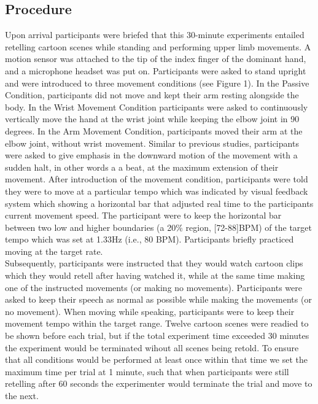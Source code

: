 \documentclass[
  man,floatsintext]{apa6}
\begin{document}
\hypertarget{procedure}{%
\subsection{Procedure}\label{procedure}}

Upon arrival participants were briefed that this 30-minute experiments entailed retelling cartoon scenes while standing and performing upper limb movements. A motion sensor was attached to the tip of the index finger of the dominant hand, and a microphone headset was put on. Participants were asked to stand upright and were introduced to three movement conditions (see Figure 1). In the Passive Condition, participants did not move and kept their arm resting alongside the body. In the Wrist Movement Condition participants were asked to continuously vertically move the hand at the wrist joint while keeping the elbow joint in 90 degrees. In the Arm Movement Condition, participants moved their arm at the elbow joint, without wrist movement. Similar to previous studies, participants were asked to give emphasis in the downward motion of the movement with a sudden halt, in other words a a beat, at the maximum extension of their movement.
After introduction of the movement condition, participants were told they were to move at a particular tempo which was indicated by visual feedback system which showing a horizontal bar that adjusted real time to the participants current movement speed. The participant were to keep the horizontal bar between two low and higher boundaries (a 20\% region, {[}72-88{]}BPM) of the target tempo which was set at 1.33Hz (i.e., 80 BPM). Participants briefly practiced moving at the target rate.\\
Subsequently, participants were instructed that they would watch cartoon clips which they would retell after having watched it, while at the same time making one of the instructed movements (or making no movements). Participants were asked to keep their speech as normal as possible while making the movements (or no movement). When moving while speaking, participants were to keep their movement tempo within the target range.
Twelve cartoon scenes were readied to be shown before each trial, but if the total experiment time exceeded 30 minutes the experiment would be terminated wihout all scenes being retold. To ensure that all conditions would be performed at least once within that time we set the maximum time per trial at 1 minute, such that when participants were still retelling after 60 seconds the experimenter would terminate the trial and move to the next.
\end{document}
